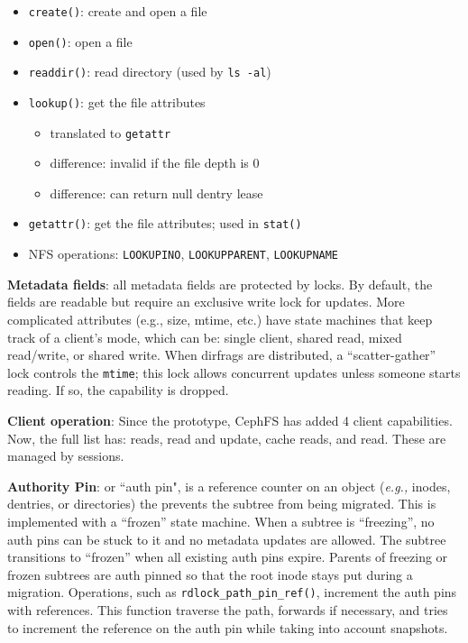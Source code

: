 \documentclass[conference]{acm_proc_article-sp} \usepackage[english]{babel}
\begin{document}
\begin{itemize}
  \item \texttt{create()}: create and open a file
  \item \texttt{open()}: open a file
  \item \texttt{readdir()}: read directory (used by \texttt{ls -al})
  \item \texttt{lookup()}: get the file attributes
  \begin{itemize} 
    \item translated to \texttt{getattr}
    \item difference: invalid if the file depth is 0
    \item difference: can return null dentry lease
  \end{itemize}
  \item \texttt{getattr()}: get the file attributes; used in \texttt{stat()}
  \item NFS operations: \texttt{LOOKUPINO}, \texttt{LOOKUPPARENT}, \texttt{LOOKUPNAME}
\end{itemize}


\textbf{Metadata fields}: all metadata fields are protected by locks. By
default, the fields are readable but require an exclusive write lock for
updates. More complicated attributes (e.g., size, mtime, etc.) have state
machines that keep track of a client's mode, which can be: single client,
shared read, mixed read/write, or shared write. When dirfrags are distributed,
a ``scatter-gather'' lock controls the \texttt{mtime}; this lock allows
concurrent updates unless someone starts reading. If so, the capability is
dropped.

\textbf{Client operation}: Since the prototype, CephFS has added 4 client
capabilities. Now, the full list has: reads, read and update, cache reads, and
read. These are managed by sessions. 

\textbf{Authority Pin}: or ``auth pin", is a reference counter on an object
({\it e.g.,} inodes, dentries, or directories) the prevents the subtree from
being migrated. This is implemented with a ``frozen'' state machine. When a
subtree is ``freezing'', no auth pins can be stuck to it and no metadata
updates are allowed. The subtree transitions to ``frozen'' when all existing
auth pins expire. Parents of freezing or frozen subtrees are auth pinned so
that the root inode stays put during a migration. Operations, such as
\texttt{rdlock\_path\_pin\_ref()}, increment the auth pins with references.
This function traverse the path, forwards if necessary, and tries to increment
the reference on the auth pin while taking into account snapshots.
\end{document}
